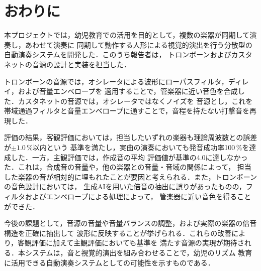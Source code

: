 \section{おわりに}
本プロジェクトでは，幼児教育での活用を目的として，複数の楽器が同期して演奏し，あわせて演奏に
同期して動作する人形による視覚的演出を行う分散型の自動演奏システムを開発した．このうち報告者は，
トロンボーンおよびカスタネットの音源の設計と実装を担当した．

トロンボーンの音源では，オシレータによる波形にローパスフィルタ，ディレイ，および音量エンベロープを
適用することで，管楽器に近い音色を合成した．カスタネットの音源では，オシレータではなくノイズを
音源とし，これを帯域通過フィルタと音量エンベロープに通すことで，音程を持たない打撃音を再現した．

評価の結果，客観評価においては，担当したいずれの楽器も理論周波数との誤差が$\pm1.0$\,\%以内という
基準を満たし，実曲の演奏においても発音成功率100\,\%を達成した．一方，主観評価では，作成音の平均
評価値が基準の4.0に達しなかった．これは，合成音の音量や，他の楽器との音量・音域の関係によって，
担当した楽器の音が相対的に埋もれたことが要因と考えられる．また，トロンボーンの音色設計においては，
生成AIを用いた倍音の抽出に誤りがあったものの，フィルタおよびエンベロープによる処理によって，
管楽器に近い音色を得ることができた．

今後の課題として，音源の音量や音量バランスの調整，および実際の楽器の倍音構造を正確に抽出して
波形に反映することが挙げられる．これらの改善により，客観評価に加えて主観評価においても基準を
満たす音源の実現が期待される．本システムは，音と視覚的演出を組み合わせることで，幼児のリズム
教育に活用できる自動演奏システムとしての可能性を示すものである．